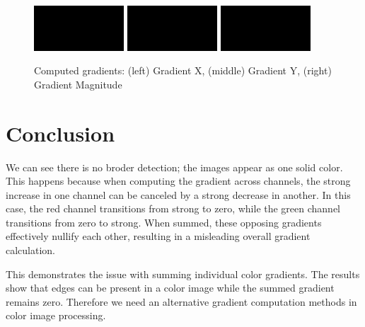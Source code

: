 \begin{figure}[h]
    \centering
    \includegraphics[width=0.3\textwidth]{../Images/gradient_x.png}
    \includegraphics[width=0.3\textwidth]{../Images/gradient_y.png}
    \includegraphics[width=0.3\textwidth]{../Images/gradient_magnitude.png}
    \caption{Computed gradients: (left) Gradient X, (middle) Gradient Y, (right) Gradient Magnitude}
    \label{fig:results}
\end{figure}

\section*{Conclusion}
We can see there is no broder detection; the images appear as one solid color.
This happens because when computing the gradient across channels, the strong increase in one channel can be canceled by a strong decrease in another. In this case, the red channel transitions from strong to zero, while the green channel transitions from zero to strong. When summed, these opposing gradients effectively nullify each other, resulting in a misleading overall gradient calculation.

This demonstrates the issue with summing individual color gradients. The results show that edges can be present in a color image while the summed gradient remains zero. Therefore we need an alternative gradient computation methods in color image processing.